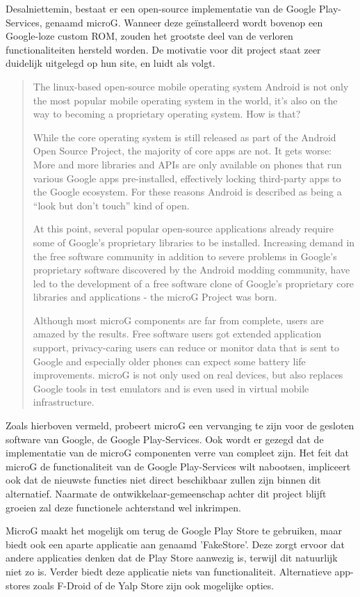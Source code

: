 Desalniettemin, bestaat er een open-source implementatie van de Google Play-Services, genaamd microG. Wanneer deze geïnstalleerd wordt bovenop een Google-loze custom ROM, zouden het grootste deel van de verloren functionaliteiten hersteld worden. De motivatie voor dit project staat zeer duidelijk uitgelegd op hun site, en luidt als volgt. \blockcquote{microg}{
    The linux-based open-source mobile operating system Android is not only the most popular mobile operating system in the world, it’s also on the way to becoming a proprietary operating system. How is that?
    
    While the core operating system is still released as part of the Android Open Source Project, the majority of core apps are not. It gets worse: More and more libraries and APIs are only available on phones that run various Google apps pre-installed, effectively locking third-party apps to the Google ecosystem. For these reasons Android is described as being a “look but don’t touch” kind of open.
    
    At this point, several popular open-source applications already require some of Google’s proprietary libraries to be installed. Increasing demand in the free software community in addition to severe problems in Google’s proprietary software discovered by the Android modding community, have led to the development of a free software clone of Google’s proprietary core libraries and applications - the microG Project was born.
    
    Although most microG components are far from complete, users are amazed by the results. Free software users got extended application support, privacy-caring users can reduce or monitor data that is sent to Google and especially older phones can expect some battery life improvements. microG is not only used on real devices, but also replaces Google tools in test emulators and is even used in virtual mobile infrastructure.}
Zoals hierboven vermeld, probeert microG een vervanging te zijn voor de gesloten software van Google, de Google Play-Services. Ook wordt er gezegd dat de implementatie van de microG componenten verre van compleet zijn. Het feit dat microG de functionaliteit van de Google Play-Services wilt nabootsen, impliceert ook dat de nieuwste functies niet direct beschikbaar zullen zijn binnen dit alternatief. Naarmate de ontwikkelaar-gemeenschap achter dit project blijft groeien zal deze functionele achterstand wel inkrimpen.

MicroG maakt het mogelijk om terug de Google Play Store te gebruiken, maar biedt ook een aparte applicatie aan genaamd 'FakeStore'. Deze zorgt ervoor dat andere applicaties denken dat de Play Store aanwezig is, terwijl dit natuurlijk niet zo is. Verder biedt deze applicatie niets van functionaliteit. Alternatieve app-stores zoals F-Droid of de Yalp Store zijn ook mogelijke opties. \autocite{shadow53_play-store}


